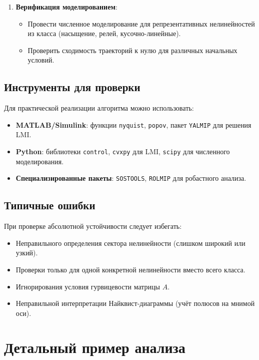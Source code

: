 \begin{enumerate}
    \item \textbf{Верификация моделированием}:
    \begin{itemize}
        \item Провести численное моделирование для репрезентативных нелинейностей из класса (насыщение, релей, кусочно-линейные).
        \item Проверить сходимость траекторий к нулю для различных начальных условий.
    \end{itemize}
\end{enumerate}

\section{Инструменты для проверки}

Для практической реализации алгоритма можно использовать:
\begin{itemize}
    \item \textbf{MATLAB/Simulink}: функции \texttt{nyquist}, \texttt{popov}, пакет \texttt{YALMIP} для решения LMI.
    \item \textbf{Python}: библиотеки \texttt{control}, \texttt{cvxpy} для LMI, \texttt{scipy} для численного моделирования.
    \item \textbf{Специализированные пакеты}: \texttt{SOSTOOLS}, \texttt{ROLMIP} для робастного анализа.
\end{itemize}

\section{Типичные ошибки}

При проверке абсолютной устойчивости следует избегать:
\begin{itemize}
    \item Неправильного определения сектора нелинейности (слишком широкий или узкий).
    \item Проверки только для одной конкретной нелинейности вместо всего класса.
    \item Игнорирования условия гурвицевости матрицы $A$.
    \item Неправильной интерпретации Найквист-диаграммы (учёт полюсов на мнимой оси).
\end{itemize}

\chapter{Детальный пример анализа}

